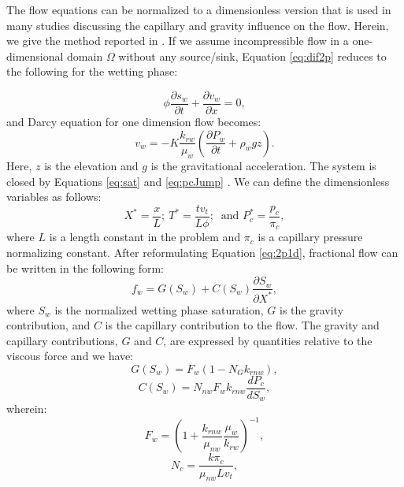 The flow equations can be normalized to a dimensionless version that is used in
many studies discussing the capillary and gravity influence on the flow.
Herein, we give the method reported in \cite{fayers1959effect}. If we assume incompressible flow in a one-dimensional domain $\Omega$
without any source/sink, Equation \ref{eq:dif2p} reduces to the following for
the wetting phase:

 \begin{equation}
  \phi \frac{\partial s_{w}}{\partial t}+ \frac {\partial v_w} {\partial x}=0,
  \label{eq:2p1d}
 \end{equation} and Darcy equation for one
dimension
flow becomes:
 \begin{equation}
  v_w=-K\frac{k_{rw}}{\mu_w}(\frac{\partial P_w}{\partial t} + \rho_w g z).
  \label{eq:D1d}
 \end{equation} Here, $z$ is the elevation and $g$ is the gravitational
acceleration. The system is closed by Equations \ref{eq:sat} and \ref{eq:pcJump}
. We can define the dimensionless variables as follows:
 \begin{equation}
  X^*=\frac{x}{L};~T^*=\frac{tv_t}{L\phi};~\mbox{ and }P^*_c=\frac{p_c}{\pi_c},
  \label{eq:var*}
 \end{equation} where $L$ is a length constant in the problem and $\pi_c$ is a
capillary pressure normalizing constant. After reformulating Equation
\ref{eq:2p1d}, fractional flow can be written in the following form:
 \begin{equation}
  f_w=G(S_w)+C(S_w)\frac{\partial S_w}{\partial X^*},
 \end{equation} where $S_w$ is the normalized wetting phase saturation, $G$ is
the gravity contribution, and $C$ is the capillary contribution to
the flow. The gravity and capillary contributions, $G$ and $C$, are expressed
by quantities relative to the viscous force \cite{hadley1956theoretical} and we
have:
 \begin{equation}
  G(S_w)=F_w(1-N_Gk_{rnw}),
  \label{eq:GrCont}
 \end{equation}
 \begin{equation}
  C(S_w)=N_{nw}F_wk_{rnw}\frac{dP_{c}}{dS_w},
  \label{eq:PcCont}
 \end{equation} wherein: 
 \begin{equation}
  F_w=(1+\frac{k_{rnw}}{\mu_{nw}}\frac{\mu_w}{k_{rw}})^{-1},
  \label{eq:Fn}
 \end{equation}
 \begin{equation}
  N_c=\frac{k\pi_c}{\mu_{nw}Lv_t},
  \label{eq:Nc}
 \end{equation}
